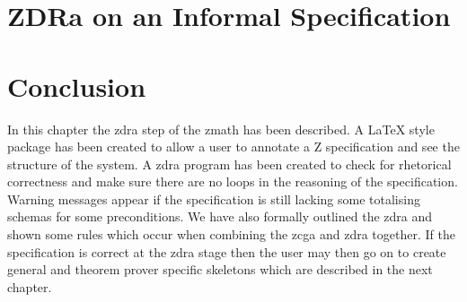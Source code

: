 


\section{ZDRa on an Informal Specification}
\label{sec:zdrainformal}

\section{Conclusion}
In this chapter the \gls{zdra} step of the \gls{zmath} has been described. A
\LaTeX{} style package has been created to allow a user to annotate a Z
specification and see the structure of the system. A \gls{zdra} program has been
created to check for rhetorical correctness and make sure there are no loops in
the reasoning of the specification. Warning messages appear if the specification
is still lacking some totalising schemas for some preconditions. We have also
formally outlined the \gls{zdra} and shown some rules which occur when combining
the \gls{zcga} and \gls{zdra} together. If the specification is correct at the
\gls{zdra} stage then the user may then go on to create general and theorem
prover specific skeletons which are described in the next chapter.